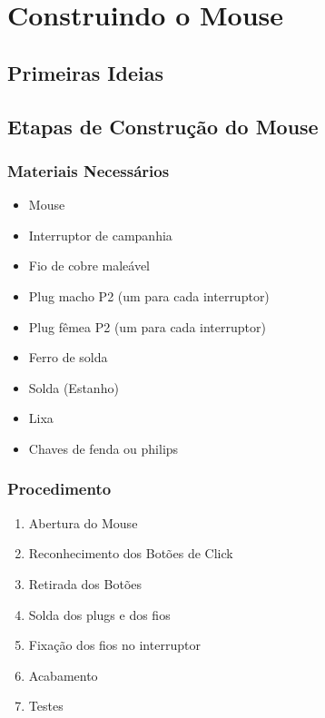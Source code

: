 \documentclass[11pt,fleqn]{book} %
\begin{document}
\chapter{Construindo o Mouse}

\section{Primeiras Ideias}

\section{Etapas de Construção do Mouse}
\subsection{Materiais Necessários}

	\begin{itemize}
	\item Mouse
    \item Interruptor de campanhia
    \item Fio de cobre maleável
    \item Plug macho P2 (um para cada interruptor)
    \item Plug fêmea P2 (um para cada interruptor)
    \item Ferro de solda
    \item Solda (Estanho)
    \item Lixa
    \item Chaves de fenda ou philips
	\end{itemize}
	
\subsection{Procedimento}
    \begin{enumerate}
    \item Abertura do Mouse
    \item Reconhecimento dos Botões de Click
    \item Retirada dos Botões
    \item Solda dos plugs e dos fios
    \item Fixação dos fios no interruptor
    \item Acabamento
    \item Testes
    \end{enumerate}
\end{document}
